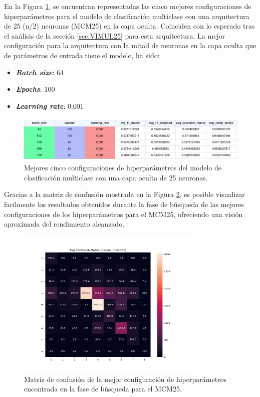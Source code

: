 En la Figura \ref{fig:MULhs25}, se encuentran representadas las cinco mejores configuraciones de hiperparámetros para el modelo de clasificación multiclase con una arquitectura de 25 (n/2) neuronas (MCM25) en la capa oculta. Coinciden con lo esperado tras el análisis de la sección \ref{sec:VIMUL25} para esta arquitectura. La mejor configuración para la arquitectura con la mitad de neuronas en la capa oculta que de parámetros de entrada tiene el modelo, ha sido:
\begin{itemize}
	\item \textbf{\textit{Batch size}}: 64
	\item \textbf{\textit{Epochs}}: 100
	\item \textbf{\textit{Learning rate}}: 0.001
\end{itemize}

\begin{figure}[H]
    \centering
    \includegraphics[width=1\textwidth]{./img/modelo/resultados/MULhs25.pdf}
    \caption{Mejores cinco configuraciones de hiperparámetros del modelo de clasificación multiclase con una capa oculta de 25 neuronas.}
    \label{fig:MULhs25}
\end{figure}

Gracias a la matriz de confusión mostrada en la Figura \ref{fig:MC_ENT_MCM25}, es posible visualizar facilmente los resultados obtenidos durante la fase de búsqueda de las mejores configuraciones de los hiperparámetros para el MCM25, ofreciendo una visión aproximada del rendimiento alcanzado.

\begin{figure}[H]
    \centering
    \includegraphics[width=0.8\textwidth]{./img/modelo/matrices_confusion/MC_ENT_MCM25.png}
    \caption{Matriz de confusión de la mejor configuración de hiperparámetros encontrada en la fase de búsqueda para el MCM25.}
    \label{fig:MC_ENT_MCM25}
\end{figure}



